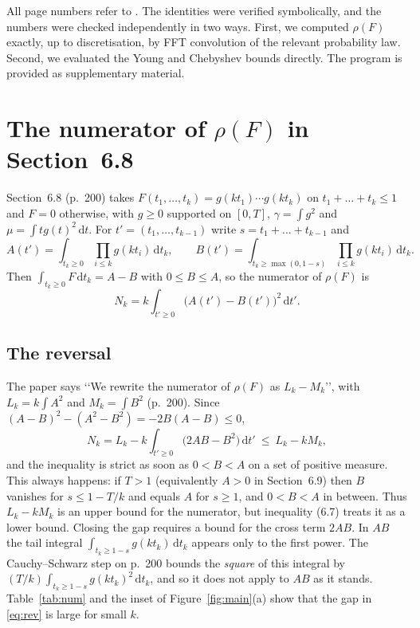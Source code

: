 \documentclass[11pt,a4paper]{amsart}
\theoremstyle{remark}
\newcommand{\dd}{\,\mathrm{d}}
\newcommand{\tp}{t'}
\begin{document}
All page numbers refer to \cite{G}. The identities were verified symbolically, and the numbers were
checked independently in two ways. First, we computed $\rho(F)$ exactly, up to discretisation, by FFT
convolution of the relevant probability law. Second, we evaluated the Young and Chebyshev bounds
directly. The program is provided as supplementary material.

\section{The numerator of \texorpdfstring{$\rho(F)$}{rho(F)} in Section~6.8}\label{sec:68}

Section~6.8 (p.~200) takes $F(t_1,\dots,t_k)=g(kt_1)\cdots g(kt_k)$ on $t_1+\dots+t_k\le1$ and $F=0$
otherwise, with $g\ge0$ supported on $[0,T]$, $\gamma=\int g^2$ and $\mu=\int tg(t)^2\dd t$. For
$\tp=(t_1,\dots,t_{k-1})$ write $s=t_1+\dots+t_{k-1}$ and
\[
A(\tp)=\int_{t_k\ge0}\prod_{i\le k}g(kt_i)\dd t_k,\qquad
B(\tp)=\int_{t_k\ge\max(0,1-s)}\prod_{i\le k}g(kt_i)\dd t_k .
\]
Then $\int_{t_k\ge0}F\dd t_k=A-B$ with $0\le B\le A$, so the numerator of $\rho(F)$ is
\begin{equation}\label{eq:N}
N_k=k\int_{\tp\ge0}\bigl(A(\tp)-B(\tp)\bigr)^2\dd\tp .
\end{equation}

\subsection*{The reversal}
The paper says \lq\lq We rewrite the numerator of $\rho(F)$ as $L_k-M_k$\rq\rq, with
$L_k=k\int A^2$ and $M_k=\int B^2$ (p.~200). Since $(A-B)^2-(A^2-B^2)=-2B(A-B)\le0$,
\begin{equation}\label{eq:rev}
N_k=L_k-k\int_{\tp\ge0}\bigl(2AB-B^2\bigr)\dd\tp\ \le\ L_k-kM_k ,
\end{equation}
and the inequality is strict as soon as $0<B<A$ on a set of positive measure. This always happens: if
$T>1$ (equivalently $A>0$ in Section~6.9) then $B$ vanishes for $s\le1-T/k$ and equals $A$ for $s\ge1$,
and $0<B<A$ in between. Thus $L_k-kM_k$ is an upper bound for the numerator, but inequality (6.7)
treats it as a lower bound. Closing the gap requires a bound for the cross term $2AB$. In $AB$ the tail
integral $\int_{t_k\ge1-s}g(kt_k)\dd t_k$ appears only to the first power. The Cauchy--Schwarz step on
p.~200 bounds the \emph{square} of this integral by $(T/k)\int_{t_k\ge1-s}g(kt_k)^2\dd t_k$, and so it
does not apply to $AB$ as it stands. Table~\ref{tab:num} and the inset of Figure~\ref{fig:main}(a) show that
the gap in \eqref{eq:rev} is large for small $k$.
\end{document}
